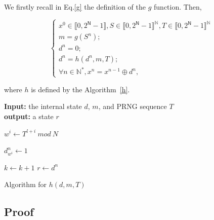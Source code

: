 We firstly recall in Eq.\ref{g} the definition of the $g$ function. Then,


\begin{equation}
\left\{
\begin{array}{l}
x^0 \in \llbracket 0, 2^\mathsf{N}-1 \rrbracket, S \in \llbracket 0, 2^\mathsf{N}-1 \rrbracket^\mathds{N}, T \in \llbracket 0, 2^\mathsf{N}-1 \rrbracket^\mathds{N}\\
m = g(S^n);\\
d^n = 0;\\
d^n = h(d^n,m,T);\\
\forall n \in \mathds{N}^*, x^n = x^{n-1} \oplus d^n,
\end{array}
\right.
\label{Version 2 CI Eq}
\end{equation}

\noindent where $h$ is defined by the Algorithm~\ref{h}.






\begin{algorithm}
\textbf{Input:} the internal state $d$, $m$, and PRNG sequence $T$\\
\textbf{output:} a state $r$\\
\begin{algorithmic}[1]
\STATE$w^i\leftarrow{T^{l+i}}~mod~N$\;
    {
\STATE      $d^n_{w^i}\leftarrow{1}$\;

    }
    {
\STATE      $k\leftarrow{ k+1}$\;
    }\ENDIF
\ENDWHILE
\STATE $r \leftarrow  d^n $\;
\medskip
\caption{Algorithm for $h(d,m,T)$}
\label{h}
\end{algorithmic}
\end{algorithm}


\subsection{Proof}
% 


